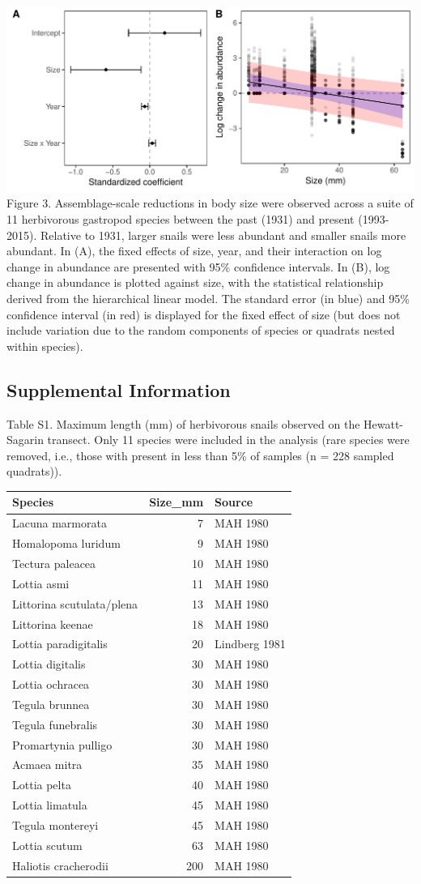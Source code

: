 \documentclass[11pt,]{article}
\begin{document}
\includegraphics[width=1.00000\textwidth]{../../figs_ms/lrr_herb_size_glmm_2panel.pdf}
Figure 3. Assemblage-scale reductions in body size were observed across
a suite of 11 herbivorous gastropod species between the past (1931) and
present (1993-2015). Relative to 1931, larger snails were less abundant
and smaller snails more abundant. In (A), the fixed effects of size,
year, and their interaction on log change in abundance are presented
with 95\% confidence intervals. In (B), log change in abundance is
plotted against size, with the statistical relationship derived from the
hierarchical linear model. The standard error (in blue) and 95\%
confidence interval (in red) is displayed for the fixed effect of size
(but does not include variation due to the random components of species
or quadrats nested within species).

\newpage 

\subsection{Supplemental Information}\label{supplemental-information}

Table S1. Maximum length (mm) of herbivorous snails observed on the
Hewatt-Sagarin transect. Only 11 species were included in the analysis
(rare species were removed, i.e., those with present in less than 5\% of
samples (n = 228 sampled quadrats)).

\begin{longtable}[]{@{}lrl@{}}
\toprule
Species & Size\_mm & Source\tabularnewline
\midrule
\endhead
Lacuna marmorata & 7 & MAH 1980\tabularnewline
Homalopoma luridum & 9 & MAH 1980\tabularnewline
Tectura paleacea & 10 & MAH 1980\tabularnewline
Lottia asmi & 11 & MAH 1980\tabularnewline
Littorina scutulata/plena & 13 & MAH 1980\tabularnewline
Littorina keenae & 18 & MAH 1980\tabularnewline
Lottia paradigitalis & 20 & Lindberg 1981\tabularnewline
Lottia digitalis & 30 & MAH 1980\tabularnewline
Lottia ochracea & 30 & MAH 1980\tabularnewline
Tegula brunnea & 30 & MAH 1980\tabularnewline
Tegula funebralis & 30 & MAH 1980\tabularnewline
Promartynia pulligo & 30 & MAH 1980\tabularnewline
Acmaea mitra & 35 & MAH 1980\tabularnewline
Lottia pelta & 40 & MAH 1980\tabularnewline
Lottia limatula & 45 & MAH 1980\tabularnewline
Tegula montereyi & 45 & MAH 1980\tabularnewline
Lottia scutum & 63 & MAH 1980\tabularnewline
Haliotis cracherodii & 200 & MAH 1980\tabularnewline
\bottomrule
\end{longtable}
\end{document}
